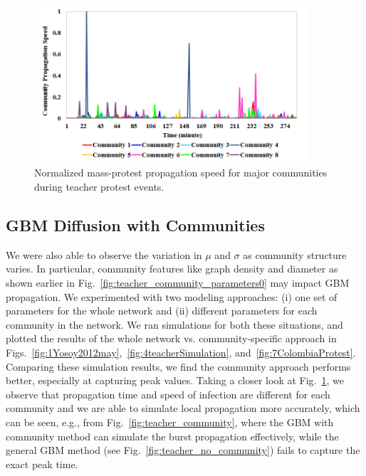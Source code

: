 \begin{figure}[ht]
\centering
\includegraphics[width=4in] {figures/4teacher-community-speed.png}
\caption{Normalized mass-protest propagation speed for major communities during teacher protest events.}
\label{fig:teacher_community_speed}
\end{figure}



\subsection{GBM Diffusion with Communities}
We were also able to observe the variation in $\mu$ and $\sigma$ as community structure varies. In particular, community features like graph density and diameter as shown earlier in Fig.~\ref{fig:teacher_community_parameters0} may impact GBM propagation.
We experimented with two modeling approaches: (i) one set of parameters for the whole network and (ii)
different parameters
for each community in the network.
We ran simulations for both these situations,
and plotted the results of the whole network vs. community-specific approach in Figs.~\ref{fig:1Yosoy2012may},~\ref{fig:4teacherSimulation}, and~\ref{fig:7ColombiaProtest}.
Comparing these simulation results, we find the community approach performs better, especially at capturing peak values. Taking a closer look at Fig.~\ref{fig:teacher_community_speed}, we observe that propagation time and speed of infection are different for each community and we are able to simulate local propagation more accurately, which can be seen, e.g.,
from Fig.~\ref{fig:teacher_community}, where
the GBM with community method can simulate the burst
propagation effectively, while the general GBM method (see Fig.~\ref{fig:teacher_no_community}) fails to capture the exact peak time.


